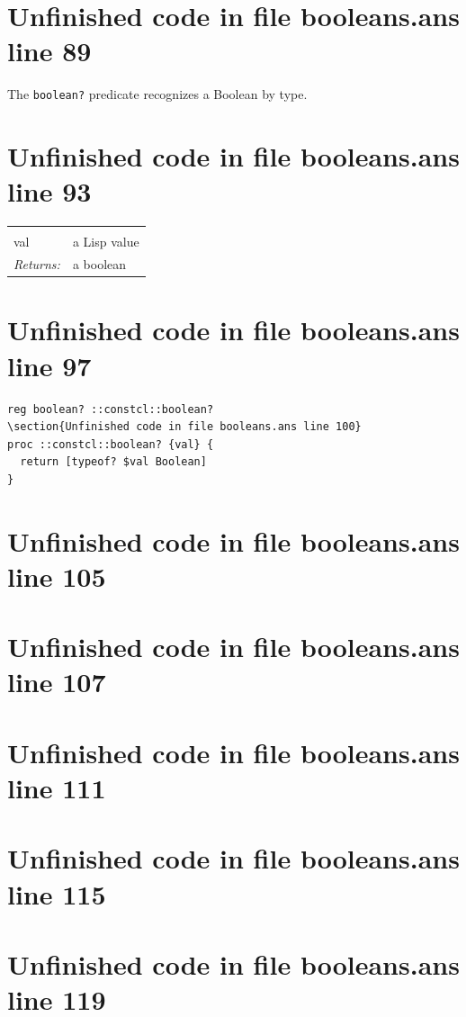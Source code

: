 \documentclass[twoside,9pt]{report}
\begin{document}
\section{Unfinished code in file booleans.ans line 89}


The \texttt{boolean?} predicate recognizes a Boolean by type.

\section{Unfinished code in file booleans.ans line 93}
\noindent\begin{tabular}{ |p{1.9cm} p{8cm}| }
\hline
\rowcolor[HTML]{CCCCCC} \multicolumn{2}{|l|}{\bf boolean? (public)} \\
val & a Lisp value \\
\textit{Returns:} & a boolean \\
\hline
\end{tabular}
\section{Unfinished code in file booleans.ans line 97}
\begin{lstlisting}
reg boolean? ::constcl::boolean?
\section{Unfinished code in file booleans.ans line 100}
proc ::constcl::boolean? {val} {
  return [typeof? $val Boolean]
}
\end{lstlisting}
\section{Unfinished code in file booleans.ans line 105}
\section{Unfinished code in file booleans.ans line 107}
\section{Unfinished code in file booleans.ans line 111}
\section{Unfinished code in file booleans.ans line 115}
\section{Unfinished code in file booleans.ans line 119}
\end{document}
